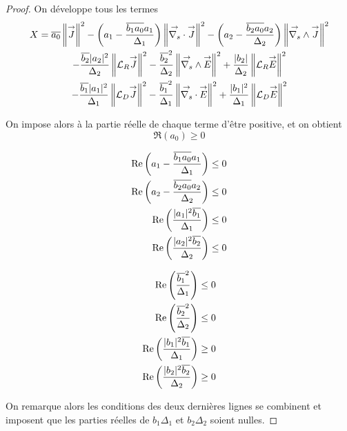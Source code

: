 \begin{proof}
    On développe tous les termes
    \begin{multline*}
      X = {\overline{a_0}} \left\lVert{\overset{\rightarrow}{J}} \right\rVert^2 - \left(a_1 - \dfrac{{\overline{b_1a_0}}a_1}{\Delta_1}\right) \left\lVert{\overset{\rightarrow}{\nabla_s}} \cdot {\overset{\rightarrow}{J}} \right\rVert^2 - \left(a_2 - \dfrac{{\overline{b_2a_0}}a_2}{\Delta_2}\right) \left\lVert{\overset{\rightarrow}{\nabla_s}} \wedge {\overset{\rightarrow}{J}} \right\rVert^2
      \\
      - \dfrac{{\overline{b_2}}|a_2|^2}{\Delta_2}\left\lVert{\mathcal{L}_R} {\overset{\rightarrow}{J}}\right\rVert^2  -  \dfrac{{\overline{b_2}}^2}{\Delta_2}\left\lVert{\overset{\rightarrow}{\nabla_s}} \wedge{\overset{\rightarrow}{E}}\right\rVert^2 +  \dfrac{|b_2|}{\Delta_2} \left\lVert{\mathcal{L}_R} {\overset{\rightarrow}{E}} \right\rVert^2
      \\
      - \dfrac{{\overline{b_1}}|a_1|^2}{\Delta_1}\left\lVert{\mathcal{L}_D} {\overset{\rightarrow}{J}}\right\rVert^2  - \dfrac{{\overline{b_1}}^2}{\Delta_1}\left\lVert{\overset{\rightarrow}{\nabla_s}} \cdot{\overset{\rightarrow}{E}}\right\rVert^2 + \dfrac{|b_1|^2}{\Delta_1} \left\lVert{\mathcal{L}_D} {\overset{\rightarrow}{E}} \right\rVert^2
    \end{multline*}

    On impose alors à la partie réelle de chaque terme d'être positive, et on obtient
    \begin{equation*}
      \Re\left(a_0\right)\ge 0
    \end{equation*}
    \begin{minipage}{0.5\textwidth}
      \begin{align*}
        \operatorname{Re}\left(a_1 - \dfrac{{\overline{b_1a_0}}a_1}{\Delta_1}\right) \le 0 \\
        \operatorname{Re}\left(a_2 - \dfrac{{\overline{b_2a_0}}a_2}{\Delta_2}\right) \le 0 \\
        \operatorname{Re}\left(\dfrac{|a_1|^2{\overline{b_1}}}{\Delta_1}\right) \le 0 \\
        \operatorname{Re}\left(\dfrac{|a_2|^2{\overline{b_2}}}{\Delta_2}\right) \le 0
      \end{align*}
    \end{minipage}
    \begin{minipage}{0.5\textwidth}
      \begin{align*}
        \operatorname{Re}\left(\dfrac{{\overline{b_1}}^2}{\Delta_1}\right) \le 0 \\
        \operatorname{Re}\left(\dfrac{{\overline{b_2}}^2}{\Delta_2}\right) \le 0 \\
        \operatorname{Re}\left(\dfrac{|b_1|^2{\overline{b_1}}}{\Delta_1}\right) \ge 0 \\
        \operatorname{Re}\left(\dfrac{|b_2|^2{\overline{b_2}}}{\Delta_2}\right) \ge 0
      \end{align*}
    \end{minipage}

    On remarque alors les conditions des deux dernières lignes se combinent et imposent que les parties réelles de \(b_1\Delta_1\) et \(b_2\Delta_2\) soient nulles.
  \end{proof}

